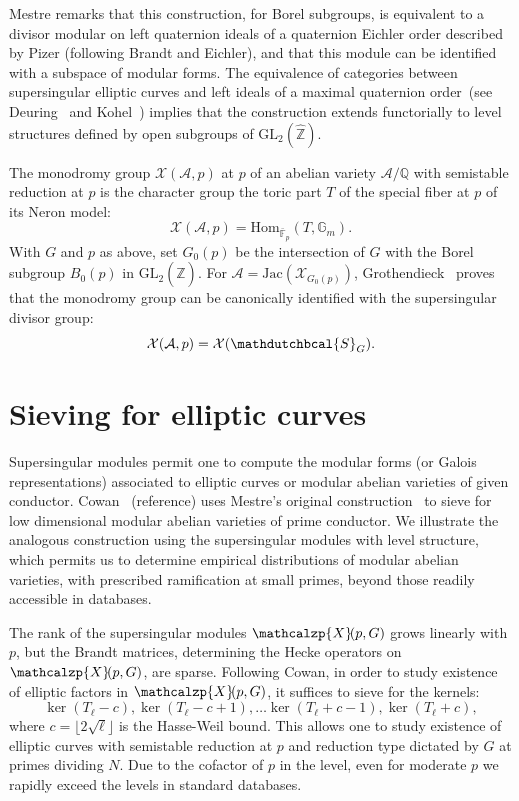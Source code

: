 \documentclass{amsart}
\newcommand{\cA}{\mathcal{A}}
\newcommand{\cS}{\mathdutchbcal{S}}
\newcommand{\cX}{\mathcal{X}}
\newcommand{\FF}{\mathbb{F}}
\newcommand{\GG}{\mathbb{G}}
\newcommand{\QQ}{\mathbb{Q}}
\newcommand{\ZZ}{\mathbb{Z}}
\newcommand{\XX}{\mathcalzp{X}\!}
\newcommand{\GL}{\mathrm{GL}}
\newcommand{\Jac}{\mathrm{Jac}}
\newcommand{\Hom}{\mathrm{Hom}}
\begin{document}
Mestre remarks that this construction, for Borel subgroups, is equivalent to
a divisor modular on left quaternion ideals of a quaternion Eichler order
described by Pizer (following Brandt and Eichler), and that this module can
be identified with a subspace of modular forms.
The equivalence of categories between supersingular elliptic curves and
left ideals of a maximal quaternion order~(see
Deuring~\cite[\S10.2]{Deuring} and Kohel~\cite[\S5.3]{Kohel96})
implies that the construction extends functorially to level structures
defined by open subgroups of $\GL_2(\hat{\ZZ})$.
\bigskip

The monodromy group $\cX(\cA,p)$ at $p$ of an abelian variety $\cA/\QQ$ with
semistable reduction at $p$ is the character group the toric part $T$ of
the special fiber at $p$ of its Neron model:
$$
\cX(\cA,p) = \Hom_{\bar{\FF}_p}(T,\GG_m).
$$
With $G$ and $p$ as above, set $G_0(p)$ be the intersection of $G$ with the
Borel subgroup $B_0(p)$ in $\GL_2(\hat{\ZZ})$. For $\cA = \Jac(\cX_{G_0(p)})$,
Grothendieck~\cite{SGA7} proves that the monodromy group can be canonically
identified with the supersingular divisor group:
$$
\cX(\cA,p) = \cX(\cS_G).
$$


%

\section*{Sieving for elliptic curves}

Supersingular modules permit one to compute the modular forms (or Galois
representations) associated to elliptic curves or modular abelian varieties
of given conductor.  Cowan~\cite{Cowan22} (reference) uses Mestre's original
construction~\cite{Mestre86} to sieve for low dimensional modular abelian
varieties of prime conductor. We illustrate the analogous construction
using the supersingular modules with level structure, which permits us
to determine empirical distributions of modular abelian varieties, with
prescribed ramification at small primes, beyond those readily accessible
in databases.

The rank of the supersingular modules $\XX(p,G)$ grows linearly with $p$,
but the Brandt matrices, determining the Hecke operators on $\XX(p,G)$,
are sparse.  Following Cowan, in order to study existence of elliptic
factors in $\XX(p,G)$, it suffices to sieve for the kernels:
$$
  \ker(T_\ell-c), \ker(T_\ell-c+1), \dots \ker(T_\ell+c-1), \ker(T_\ell+c), 
$$
where $c = \lfloor 2\sqrt{\ell}\rfloor$ is the Hasse-Weil bound.
This allows one to study existence of elliptic curves with semistable
reduction at $p$ and reduction type dictated by $G$ at primes dividing $N$.
Due to the cofactor of $p$ in the level, even for moderate $p$ we
rapidly exceed the levels in standard databases.
\end{document}
